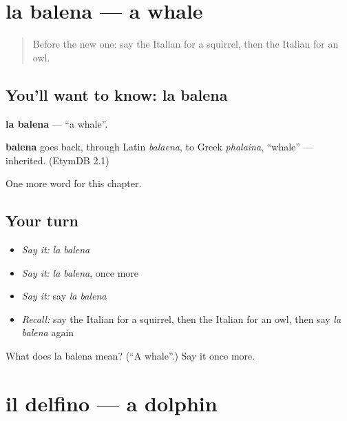 \section[la balena]{la balena — a whale}

\label{lesson:IT-C121-balena}



\begin{quote}
Before the new one: say the Italian for a squirrel, then the Italian for an owl.
\end{quote}

\subsection*{You'll want to know: la balena}
\textbf{la balena} — \textquotedblleft{}a whale\textquotedblright{}.

\begin{cousinweb}
\textbf{balena} goes back, through Latin \emph{balaena}, to Greek \emph{phalaina}, \textquotedblleft{}whale\textquotedblright{} — inherited. (EtymDB 2.1)
\end{cousinweb}

\begin{grammarlens}[title={What you've built}]
One more word for this chapter.
\end{grammarlens}

\subsection*{Your turn}
\begin{itemize}
\raggedright
  \item \emph{Say it:} \emph{la balena}
  \item \emph{Say it:} \emph{la balena}, once more
  \item \emph{Say it:} say \emph{la balena}
  \item \emph{Recall:} say the Italian for a squirrel, then the Italian for an owl, then say \emph{la balena} again
\end{itemize}

\begin{tcolorbox}[breakable,colback=teal!4,colframe=teal!35!black,title={Before you move on}]
What does la balena mean? (\textquotedblleft{}A whale\textquotedblright{}.) Say it once more.
\end{tcolorbox}
\section[il delfino]{il delfino — a dolphin}

